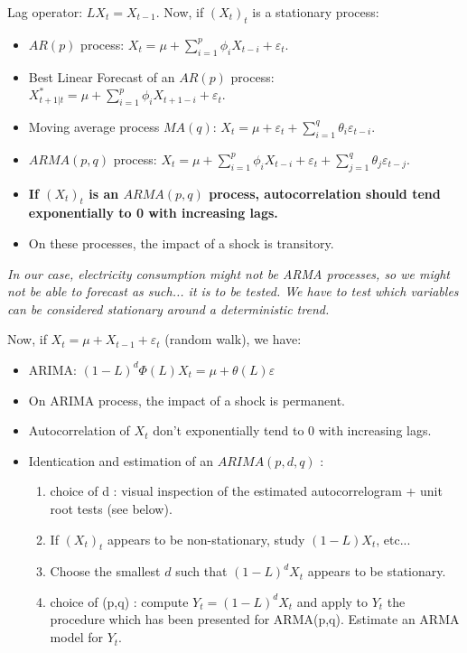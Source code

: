Lag operator: $LX_t = X_{t-1}$. Now, if $(X_t)_t$ is a stationary process:
\begin{itemize}
    \item $AR(p)$ process: $X_t = \mu + \sum_{i=1}^{p} \phi_i X_{t-i} + \varepsilon_t$.
    \item Best Linear Forecast of an $AR(p)$ process: $X^*_{t+1\vert t} = \mu + \sum_{i=1}^{p} \phi_i X_{t+1-i} + \varepsilon_t$.
    \item Moving average process $MA(q)$: $X_t = \mu + \varepsilon_t + \sum_{i=1}^{q} \theta_i \varepsilon_{t-i}$.
    \item $ARMA(p, q)$ process: $X_t = \mu + \sum_{i=1}^{p} \phi_i X_{t-i} + \varepsilon_t + \sum_{j=1}^{q} \theta_j \varepsilon_{t-j}$.
    \item \textbf{If $(X_t)_t$ is an $ARMA(p, q)$ process, autocorrelation should tend exponentially to 0 with increasing lags.}
    \item On these processes, the impact of a shock is transitory.
\end{itemize}

\textit{In our case, electricity consumption might not be ARMA processes, so we might not be able to forecast as such... it is to be tested. We have to test which variables can be considered stationary around a deterministic trend.}

Now, if $X_t = \mu + X_{t-1} + \varepsilon_t$ (random walk), we have: 
\begin{itemize}
    \item ARIMA: $(1 - L)^d \Phi(L)X_t = \mu + \theta(L) \varepsilon$
    \item On ARIMA process, the impact of a shock is permanent.
    \item Autocorrelation of $X_t$ don't exponentially tend to 0 with increasing lags.
    \item Identication and estimation of an $ARIMA(p,d,q)$ :
    \begin{enumerate}
    \item choice of d : visual inspection of the estimated
    autocorrelogram + unit root tests (see below).
    \item If $(X_t)_t$ appears to be non-stationary, study $(1-L)X_t$, etc...
    \item Choose the smallest $d$ such that $(1-L)^d X_t$ appears to be stationary.
    \item choice of (p,q) : compute $Y_t = (1-L)^d X_t$ and apply to $Y_t$ the procedure which has been presented for ARMA(p,q).
    Estimate an ARMA model for $Y_t$.
    \end{enumerate}
\end{itemize}

